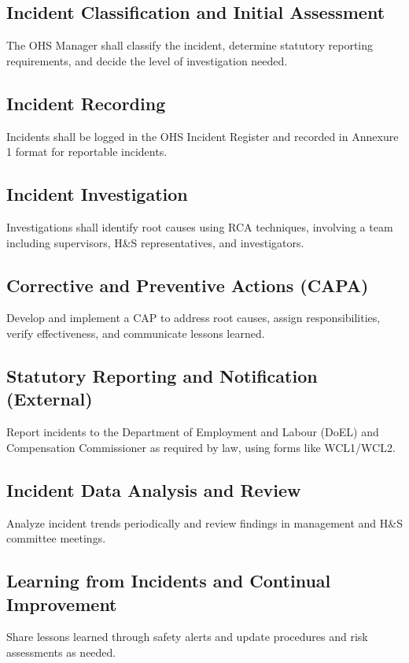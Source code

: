 \documentclass[12pt]{article}
\begin{document}
\subsection{Incident Classification and Initial Assessment}
The OHS Manager shall classify the incident, determine statutory reporting requirements, and decide the level of investigation needed.

\subsection{Incident Recording}
Incidents shall be logged in the OHS Incident Register and recorded in Annexure 1 format for reportable incidents.

\subsection{Incident Investigation}
Investigations shall identify root causes using RCA techniques, involving a team including supervisors, H\&S representatives, and investigators.

\subsection{Corrective and Preventive Actions (CAPA)}
Develop and implement a CAP to address root causes, assign responsibilities, verify effectiveness, and communicate lessons learned.

\subsection{Statutory Reporting and Notification (External)}
Report incidents to the Department of Employment and Labour (DoEL) and Compensation Commissioner as required by law, using forms like WCL1/WCL2.

\subsection{Incident Data Analysis and Review}
Analyze incident trends periodically and review findings in management and H\&S committee meetings.

\subsection{Learning from Incidents and Continual Improvement}
Share lessons learned through safety alerts and update procedures and risk assessments as needed.
\end{document}
